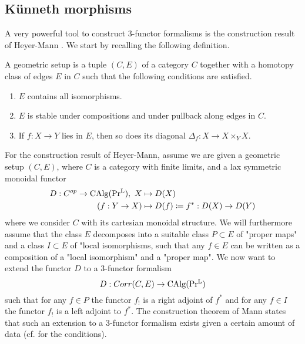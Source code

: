 \subsection{Künneth morphisms}\label{Künneth modules in $6$-functor formalisms}
A very powerful tool to construct $3$-functor formalisms is the construction result of Heyer-Mann \Cite[Proposition 3.3.3]{heyer20246}. We start by recalling the following definition.
\begin{definition}\Cite[Definition 2.1.1, Remark 2.1.2]{heyer20246}
A geometric setup is a tuple $(C,E)$ of a category $C$ together with a homotopy class of edges $E$ in $C$ such that the following conditions are satisfied.
\begin{enumerate}
    \item $E$ contains all isomorphisms. 
    \item $E$ is stable under compositions and under pullback along edges in $C$. 
    \item If $f :X \to Y$ lies in $E$, then so does its diagonal $\Delta_f: X \to X \times_Y X$.
\end{enumerate}
  
\end{definition}
For the construction result of Heyer-Mann, assume we are given a geometric setup $(C,E)$, where $C$ is a category with finite limits, and a lax symmetric monoidal functor 
\begin{align*}
  D : C^{op} \to \operatorname{CAlg}(\operatorname{Pr^{L}}), \ X &\mapsto D(X)   \\
   (f: Y \to X) &\mapsto  D(f)\coloneqq f^* : D(X) \to D(Y)
\end{align*}
where we consider $C$ with its cartesian monoidal structure. We will furthermore assume that the class $E$ decomposes into a suitable class $P\subset E$ of "proper maps" and a class $I\subset E$ of "local isomorphisms, such that any $f\in E$ can be written as a composition of a "local isomorphism" and a "proper map". We now want to extend the functor $D$ to a $3$-functor formalism 
\[
D: Corr(C,E) \to \operatorname{CAlg}(\operatorname{Pr^{L}})
\]
such that for any $f\in P$ the functor $f_!$ is a right adjoint of $f^*$ and for any $f\in I$ the functor $f_!$ is a left adjoint to $f^*$. The construction theorem of Mann states that such an extension to a $3$-functor formalism exists given a certain amount of data (cf. \Cite[Proposition 3.3.3]{heyer20246} for the conditions).\\



